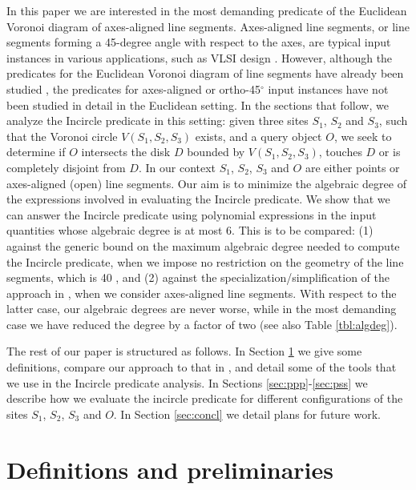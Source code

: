 \documentclass[letterpaper,11pt]{article}
\newcommand{\incircle}{\textsf{Incircle}\xspace}
\newcommand{\vor}{Voronoi\xspace}
\begin{document}
In this paper we are interested in the most demanding predicate of the
Euclidean Voronoi diagram of axes-aligned line segments. Axes-aligned
line segments, or line segments forming a 45-degree angle with respect
to the axes, are typical input instances in various applications, such
as VLSI design \cite{p-cacmm-01,gp-yao-08}. However, although the
predicates for the Euclidean \vor diagram of line segments have
already been studied \cite{b-ecvdl-96}, the predicates for
axes-aligned or ortho-45$^\circ$ input instances have not been studied
in detail in the Euclidean setting.
In the sections that follow, we analyze the \incircle predicate in this
setting: given three sites $S_1$, $S_2$ and $S_3$, such that the \vor
circle $V(S_1,S_2,S_3)$ exists, and a query object $O$, we seek to
determine if $O$ intersects the disk $D$ bounded by $V(S_1,S_2,S_3)$,
touches $D$ or is completely disjoint from $D$. In our context $S_1$,
$S_2$, $S_3$ and $O$ are either points or axes-aligned (open) line
segments.
Our aim is to minimize the algebraic degree of the expressions involved in
evaluating the \incircle predicate. We show that we can answer the
\incircle predicate using polynomial expressions in the input
quantities whose algebraic degree is at most 6. This is to be compared:
(1) against the generic bound on the maximum algebraic degree needed to
compute the \incircle predicate, when we impose no restriction on the
geometry of the line segments, which is 40 \cite{b-ecvdl-96}, and
(2) against the specialization/simplification of the approach in
\cite{b-ecvdl-96}, when we consider axes-aligned line segments. With
respect to the latter case, our algebraic degrees are never worse,
while in the most demanding case we have reduced the degree by a
factor of two (see also Table \ref{tbl:algdeg}).

The rest of our paper is structured as follows. In Section
\ref{sec:prelims} we give some definitions, compare our approach to
that in \cite{b-ecvdl-96}, and detail some of the tools that we use
in the \incircle predicate analysis. In Sections \ref{sec:ppp}-\ref{sec:pss}
we describe how we evaluate the incircle predicate for different
configurations of the sites $S_1$, $S_2$, $S_3$ and $O$. In Section
\ref{sec:concl} we detail plans for future work.


\section{Definitions and preliminaries}\label{sec:prelims}
\end{document}
